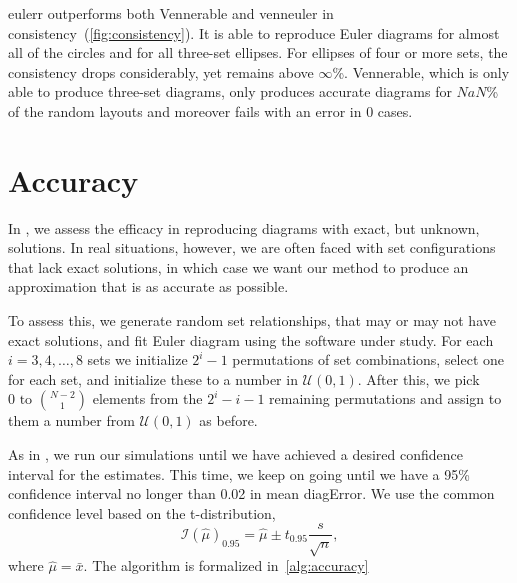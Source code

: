 \documentclass[
  oneside,
  openany,
  numbers=noendperiod,
  parskip=half,
  bibliography=totoc
]{scrbook}\usepackage[]{graphicx}\usepackage{xcolor}
\newcommand{\pkg}[1]{{\fontseries{b}\selectfont #1}}
\begin{document}
\pkg{eulerr} outperforms both \pkg{Vennerable} and \pkg{venneuler} in
consistency~(\cref{fig:consistency}). It is able to reproduce Euler diagrams for
almost all of the circles and for all three-set ellipses. For ellipses of four
or more sets, the consistency drops considerably, yet remains above
\ensuremath{\infty{}}\%. \pkg{Vennerable}, which
is only able to produce three-set diagrams, only produces accurate diagrams for
\ensuremath{NaN}\% of the random layouts and moreover
fails with an error in 0 cases.

\section{Accuracy}
\label{sec:accuracy}

In , we assess the efficacy in reproducing diagrams
with exact, but unknown, solutions. In real situations, however, we are often
faced with set configurations that lack exact solutions, in which case we want
our method to produce an approximation that is as accurate as possible.

To assess this, we generate random set relationships, that may or may not have
exact solutions, and fit Euler diagram using the software under study. For each
$i=3,4,\dots,8$ sets we initialize $2^i-1$ permutations of set combinations,
select one for each set, and initialize these to a number in
$\mathcal{U}(0, 1)$. After this, we pick $0 \text{ to } \binom{N-2}{1}$ elements
from the $2^i-i-1$ remaining permutations and assign to them a number from
$\mathcal{U}(0, 1)$ as before.

As in , we run our simulations until we have achieved
a desired confidence interval for the estimates. This time, we keep on going
until we have a 95\% confidence interval no longer than 0.02 in mean diagError.
We use the common confidence level based on the t-distribution,
\begin{equation}
\mathcal{I}(\hat{\mu})_{0.95} = \hat{\mu} \pm t_{0.95}\frac{s}{\sqrt{n}},
\end{equation}
where $\hat{\mu} = \bar{x}$. The algorithm is formalized in~\autoref{alg:accuracy}
\end{document}
